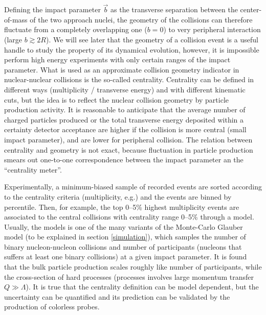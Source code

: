 Defining the impact parameter $\vec{b}$ as the transverse separation between the center-of-mass of the two approach nuclei,
the geometry of the collisions can therefore fluctuate from a completely overlapping one ($b=0$) to very peripheral interaction (large $b \gtrsim 2R$).
We will see later that the geometry of a collision event is a useful handle to study the property of its dynamical evolution, however, it is impossible perform high energy experiments with only certain ranges of the impact parameter. 
What is used as an approximate collision geometry indicator in nuclear-nuclear collisions is the so-called centrality.
Centrality can be defined in different ways (multiplicity / transverse energy) and with different kinematic cuts, but the idea is to reflect the nuclear collision geometry by particle production activity.
It is reasonable to anticipate that the average number of charged particles produced or the total transverse energy deposited within a certainty detector acceptance are higher if the collision is more central (small impact parameter), and are lower for peripheral collision.
The relation between centrality and geometry is not exact, because fluctuation in particle production smears out one-to-one correspondence between the impact parameter an the ``centrality meter''.

Experimentally, a minimum-biased sample of recorded events are sorted according to the centrality criteria (multiplicity, e.g.) and the events are binned by percentile.
Then, for example, the top 0--5\% highest multiplicity events are associated to the central collisions with centrality range 0--5\% through a model.
Usually, the models is one of the many variants of the Monte-Carlo Glauber model (to be explained in section \ref{simulation}), which samples the  number of binary nucleon-nucleon collisions and number of participants (nucleons that suffers at least one binary collisions) at a given impact parameter.
It is found that the bulk particle production scales roughly like number of participants, while the cross-section of hard processes (processes involves large momentum transfer $Q \gg \Lambda$).
It is true that the centrality definition can be model dependent, but the uncertainty can be quantified and its prediction can be validated by the production of colorless probes.


